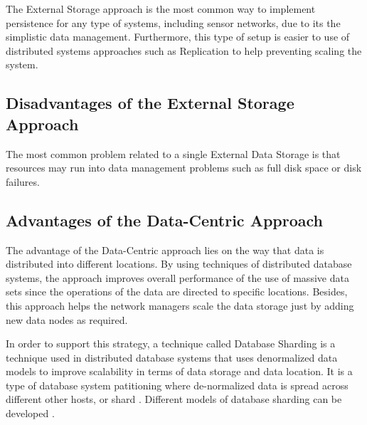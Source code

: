 The External Storage approach is the most common way to implement persistence
for any type of systems, including sensor networks, due to its the simplistic
data management. Furthermore, this type of setup is easier to use of
distributed systems approaches such as Replication to help preventing scaling
the system.

\subsection{Disadvantages of the External Storage Approach}

The most common problem related to a single External Data Storage is that
resources may run into data management problems such as full disk space or disk
failures.

\subsection{Advantages of the Data-Centric Approach}

The advantage of the Data-Centric approach lies on the way that data is
distributed into different locations. By using techniques of distributed
database systems, the approach improves overall performance of the use of
massive data sets since the operations of the data are directed to specific
locations. Besides, this approach helps the network managers scale the data
storage just by adding new data nodes as required.

In order to support this strategy, a technique called Database Sharding
\cite{db-shard02} is a technique used in distributed database systems that
uses denormalized data models to improve scalability in terms of data storage
and data location. It is a type of database system patitioning where
de-normalized data is spread across different other hosts, or shard \cite{db-shard01}.
Different models of database sharding can be developed \cite{db-shard-schemas}.


